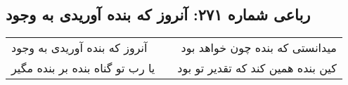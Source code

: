 \begin{center}
\section*{رباعی شماره ۲۷۱: آنروز که بنده آوریدی به وجود}
\label{sec:sh271}
\begin{longtable}{l p{0.5cm} r}
آنروز که بنده آوریدی به وجود
&&
میدانستی که بنده چون خواهد بود
\\
یا رب تو گناه بنده بر بنده مگیر
&&
کین بنده همین کند که تقدیر تو بود
\\
\end{longtable}
\end{center}
